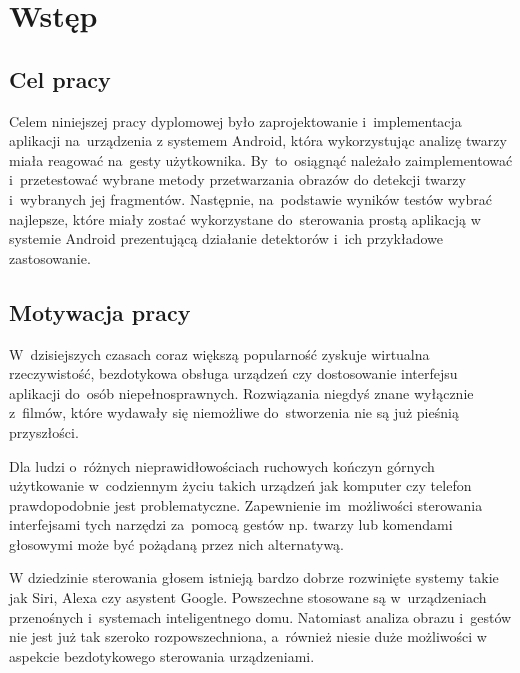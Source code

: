 \newpage

\section{Wstęp}


\subsection{Cel pracy}

Celem niniejszej pracy dyplomowej było zaprojektowanie i~implementacja aplikacji na~urządzenia z systemem Android, która wykorzystując analizę twarzy miała reagować na~gesty użytkownika. By~to~osiągnąć należało zaimplementować i~przetestować wybrane metody przetwarzania obrazów do detekcji twarzy i~wybranych jej fragmentów. Następnie, na~podstawie wyników testów wybrać najlepsze, które miały zostać wykorzystane do~sterowania prostą aplikacją w systemie Android prezentującą działanie detektorów i~ich przykładowe zastosowanie.



\subsection{Motywacja pracy}

W~dzisiejszych czasach coraz większą popularność zyskuje wirtualna rzeczywistość, bezdotykowa obsługa urządzeń czy dostosowanie interfejsu aplikacji do~osób niepełnosprawnych. Rozwiązania niegdyś znane wyłącznie z~filmów, które wydawały się niemożliwe do~stworzenia nie są już pieśnią przyszłości.

\par

Dla ludzi o~różnych nieprawidłowościach ruchowych kończyn górnych użytkowanie w~codziennym życiu takich urządzeń jak komputer czy telefon prawdopodobnie jest problematyczne. Zapewnienie im~możliwości sterowania interfejsami tych narzędzi za~pomocą gestów np. twarzy lub komendami głosowymi może być pożądaną przez nich alternatywą. 

\par

W dziedzinie sterowania głosem istnieją bardzo dobrze rozwinięte systemy takie jak Siri, Alexa czy asystent Google. Powszechne stosowane są w~urządzeniach przenośnych i~systemach inteligentnego domu. Natomiast analiza obrazu i~gestów nie jest już tak szeroko rozpowszechniona, a~również niesie duże możliwości w aspekcie bezdotykowego sterowania urządzeniami.  

